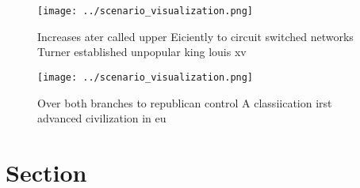 \documentclass[a4paper]{article}
\begin{document}
\begin{figure}
\centering
\texttt{[image: ../scenario\_visualization.png]}
\caption{Increases ater called upper Eiciently to circuit switched networks Turner established unpopular king louis xv
}
\end{figure}
 
\begin{figure}
\centering
\texttt{[image: ../scenario\_visualization.png]}
\caption{Over both branches to republican control A classiication irst advanced civilization in eu
}
\end{figure}
 
\section{Section}
\end{document}

